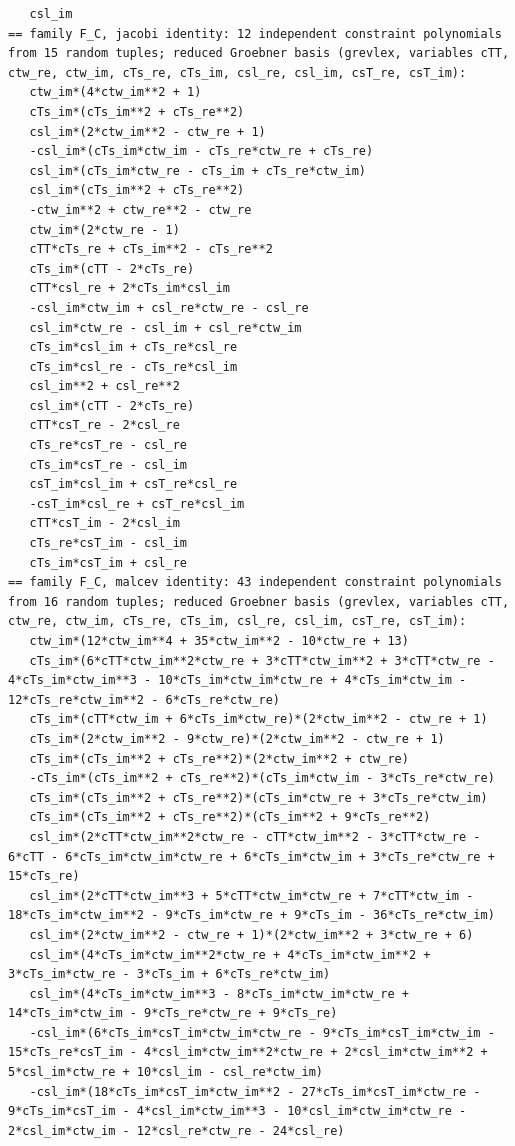 \documentclass[
  10pt,
]{article}
\begin{document}
\begin{verbatim}
   csl_im
== family F_C, jacobi identity: 12 independent constraint polynomials from 15 random tuples; reduced Groebner basis (grevlex, variables cTT, ctw_re, ctw_im, cTs_re, cTs_im, csl_re, csl_im, csT_re, csT_im):
   ctw_im*(4*ctw_im**2 + 1)
   cTs_im*(cTs_im**2 + cTs_re**2)
   csl_im*(2*ctw_im**2 - ctw_re + 1)
   -csl_im*(cTs_im*ctw_im - cTs_re*ctw_re + cTs_re)
   csl_im*(cTs_im*ctw_re - cTs_im + cTs_re*ctw_im)
   csl_im*(cTs_im**2 + cTs_re**2)
   -ctw_im**2 + ctw_re**2 - ctw_re
   ctw_im*(2*ctw_re - 1)
   cTT*cTs_re + cTs_im**2 - cTs_re**2
   cTs_im*(cTT - 2*cTs_re)
   cTT*csl_re + 2*cTs_im*csl_im
   -csl_im*ctw_im + csl_re*ctw_re - csl_re
   csl_im*ctw_re - csl_im + csl_re*ctw_im
   cTs_im*csl_im + cTs_re*csl_re
   cTs_im*csl_re - cTs_re*csl_im
   csl_im**2 + csl_re**2
   csl_im*(cTT - 2*cTs_re)
   cTT*csT_re - 2*csl_re
   cTs_re*csT_re - csl_re
   cTs_im*csT_re - csl_im
   csT_im*csl_im + csT_re*csl_re
   -csT_im*csl_re + csT_re*csl_im
   cTT*csT_im - 2*csl_im
   cTs_re*csT_im - csl_im
   cTs_im*csT_im + csl_re
== family F_C, malcev identity: 43 independent constraint polynomials from 16 random tuples; reduced Groebner basis (grevlex, variables cTT, ctw_re, ctw_im, cTs_re, cTs_im, csl_re, csl_im, csT_re, csT_im):
   ctw_im*(12*ctw_im**4 + 35*ctw_im**2 - 10*ctw_re + 13)
   cTs_im*(6*cTT*ctw_im**2*ctw_re + 3*cTT*ctw_im**2 + 3*cTT*ctw_re - 4*cTs_im*ctw_im**3 - 10*cTs_im*ctw_im*ctw_re + 4*cTs_im*ctw_im - 12*cTs_re*ctw_im**2 - 6*cTs_re*ctw_re)
   cTs_im*(cTT*ctw_im + 6*cTs_im*ctw_re)*(2*ctw_im**2 - ctw_re + 1)
   cTs_im*(2*ctw_im**2 - 9*ctw_re)*(2*ctw_im**2 - ctw_re + 1)
   cTs_im*(cTs_im**2 + cTs_re**2)*(2*ctw_im**2 + ctw_re)
   -cTs_im*(cTs_im**2 + cTs_re**2)*(cTs_im*ctw_im - 3*cTs_re*ctw_re)
   cTs_im*(cTs_im**2 + cTs_re**2)*(cTs_im*ctw_re + 3*cTs_re*ctw_im)
   cTs_im*(cTs_im**2 + cTs_re**2)*(cTs_im**2 + 9*cTs_re**2)
   csl_im*(2*cTT*ctw_im**2*ctw_re - cTT*ctw_im**2 - 3*cTT*ctw_re - 6*cTT - 6*cTs_im*ctw_im*ctw_re + 6*cTs_im*ctw_im + 3*cTs_re*ctw_re + 15*cTs_re)
   csl_im*(2*cTT*ctw_im**3 + 5*cTT*ctw_im*ctw_re + 7*cTT*ctw_im - 18*cTs_im*ctw_im**2 - 9*cTs_im*ctw_re + 9*cTs_im - 36*cTs_re*ctw_im)
   csl_im*(2*ctw_im**2 - ctw_re + 1)*(2*ctw_im**2 + 3*ctw_re + 6)
   csl_im*(4*cTs_im*ctw_im**2*ctw_re + 4*cTs_im*ctw_im**2 + 3*cTs_im*ctw_re - 3*cTs_im + 6*cTs_re*ctw_im)
   csl_im*(4*cTs_im*ctw_im**3 - 8*cTs_im*ctw_im*ctw_re + 14*cTs_im*ctw_im - 9*cTs_re*ctw_re + 9*cTs_re)
   -csl_im*(6*cTs_im*csT_im*ctw_im*ctw_re - 9*cTs_im*csT_im*ctw_im - 15*cTs_re*csT_im - 4*csl_im*ctw_im**2*ctw_re + 2*csl_im*ctw_im**2 + 5*csl_im*ctw_re + 10*csl_im - csl_re*ctw_im)
   -csl_im*(18*cTs_im*csT_im*ctw_im**2 - 27*cTs_im*csT_im*ctw_re - 9*cTs_im*csT_im - 4*csl_im*ctw_im**3 - 10*csl_im*ctw_im*ctw_re - 2*csl_im*ctw_im - 12*csl_re*ctw_re - 24*csl_re)

\end{verbatim}
\end{document}
